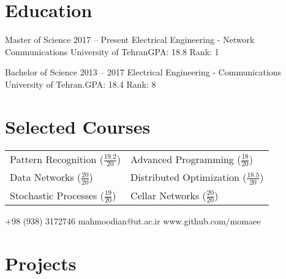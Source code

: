 \documentclass{tccv}
\begin{document}
\section{Education}
\begin{yearlist}
	\item[Master of Science]{2017 -- Present}
	{Electrical Engineering - Network Communications}
	{University of Tehran\newline GPA: 18.8 \newline Rank: 1}
	
	\item[Bachelor of Science]{2013 -- 2017}
	{Electrical Engineering - Communications}
	{University of Tehran.\newline GPA: 18.4 \newline Rank: 8}
\end{yearlist}

\section{Selected Courses}
\begin{tabular}{ll}
	Pattern Recognition ($\frac{19.2}{20}$)	&Advanced Programming ($\frac{18}{20}$) \\
	Data Networks ($\frac{20}{20}$)			&Distributed Optimization ($\frac{18.5}{20}$) \\
	Stochastic Processes ($\frac{19}{20}$)	&Cellar Networks ($\frac{20}{20}$)
\end{tabular}

    {+98 (938) 3172746}
    {mahmoodian@ut.ac.ir}
    {www.github.com/momaee}

\section{Projects}
\end{document}

